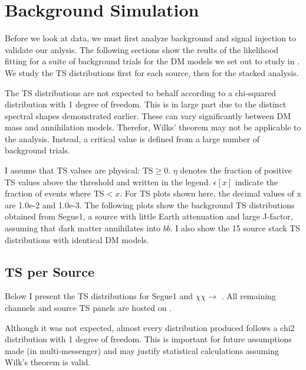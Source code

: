 \section{Background Simulation}\label{sec:icDM_bkgd_sim}

Before we look at data, we must first analyze background and signal injection to validate our anlysis.
The following sections show the reults of the likelihood fitting for a suite of background trials for the DM models we set out to study in .
We study the TS distributions first for each source, then for the stacked analysis.

The TS distributions are not expected to behalf according to a chi-squared distribution with 1 degree of freedom.
This is in large part due to the distinct spectral shapes demonstrated earlier.
These can vary significantly between DM mass and annihilation models.
Therefor, Wilks' theorem may not be applicable to the analysis.
Instead, a critical value is defined from a large number of background trials.

I assume that TS values are physical: $ \mathrm{TS} \ge 0 $.
$\eta$ denotes the fraction of positive TS values above the threshold and written in the legend.
$ \epsilon[x] $ indicate the fraction of events where $ \mathrm{TS} < x $. For TS plots shown here, the decimal values of x are 1.0e-2 and 1.0e-3.
The following plots show the background TS distributions obtained from Segue1, a source with little Earth attenuation and large J-factor, assuming that dark matter annihilates into $b\overline{b}$.
I also show the 15 source stack TS distributions with identical DM models.

\subsection{TS per Source} \label{sec:icDM_TSperSrc}

Below I present the TS distributions for Segue1 and $ \chi\chi \rightarrow$ . All remaining channels and source TS panels are hosted on .

Although it was not expected, almost every distribution produced follows a chi2 distribution with 1 degree of freedom.
This is important for future assumptions made (in multi-messenger) and may justify statistical calculations assuming Wilk's theorem is valid.

